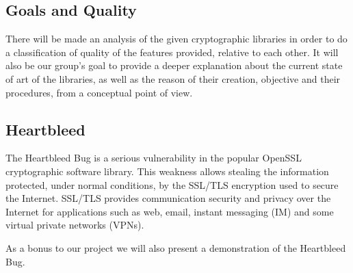 \documentclass[a4paper]{article}
\begin{document}
\subsection{Goals and Quality}
There will be made an analysis of the given cryptographic libraries in order to do a classification of quality of the features provided, relative to each other. It will also be our group's goal to provide a deeper explanation about the current state of art of the libraries, as well as the reason of their creation, objective and their procedures, from a conceptual point of view. 

\subsection{Heartbleed}
The Heartbleed Bug is a serious vulnerability in the popular OpenSSL cryptographic software library. This weakness allows stealing the information protected, under normal conditions, by the SSL/TLS encryption used to secure the Internet. SSL/TLS provides communication security and privacy over the Internet for applications such as web, email, instant messaging (IM) and some virtual private networks (VPNs).\cite{heartbleed}

As a bonus to our project we will also present a demonstration of the Heartbleed Bug.\cite{heartbleed-poc}

\printbibliography
\end{document}
